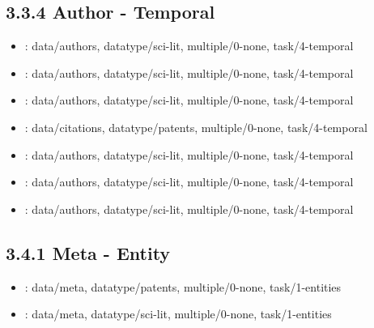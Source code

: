 \begin {refsection}
\section [3.3.4 Author - Temporal] {3.3.4 Author - Temporal}

\begin {itemize}
\item \cite {bach-2014-graphdiaries:-animated-transitions-and-temporal-navigation}:
    data/authors, datatype/sci-lit, multiple/0-none, task/4-temporal


\item \cite {heer-2011-orion:-a-system-for-modeling-transformation-and-visualization}:
    data/authors, datatype/sci-lit, multiple/0-none, task/4-temporal


\item \cite {shi-2015-1.5d-egocentric-dynamic-network-visualization}:
    data/authors, datatype/sci-lit, multiple/0-none, task/4-temporal


\item \cite {kutz-2004-examining-the-evolution-and-distribution-of-patent-classifications}:
    data/citations, datatype/patents, multiple/0-none, task/4-temporal


\item \cite {keim-2004-exploring-and-visualizing-the-history-of-infovis}:
    data/authors, datatype/sci-lit, multiple/0-none, task/4-temporal


\item \cite {kurosawa-2011-predicting-researchers-future-activities-using}:
    data/authors, datatype/sci-lit, multiple/0-none, task/4-temporal


\item \cite {huang-2006-analysis-and-visualization-of-co-authorship-networks-for-understanding}:
    data/authors, datatype/sci-lit, multiple/0-none, task/4-temporal


\end {itemize}
\printbibliography
\end {refsection}\pagebreak

\begin {refsection}
\section [3.4.1 Meta - Entity] {3.4.1 Meta - Entity}

\begin {itemize}
\item \cite {giereth-2008-utilization-of-semantic-annotations-in-interactive-user}:
    data/meta, datatype/patents, multiple/0-none, task/1-entities


\item \cite {beck-2016-visual-analysis-and-dissemination-of-scientific-literature}:
    data/meta, datatype/sci-lit, multiple/0-none, task/1-entities


\end {itemize}
\printbibliography
\end {refsection}\pagebreak

